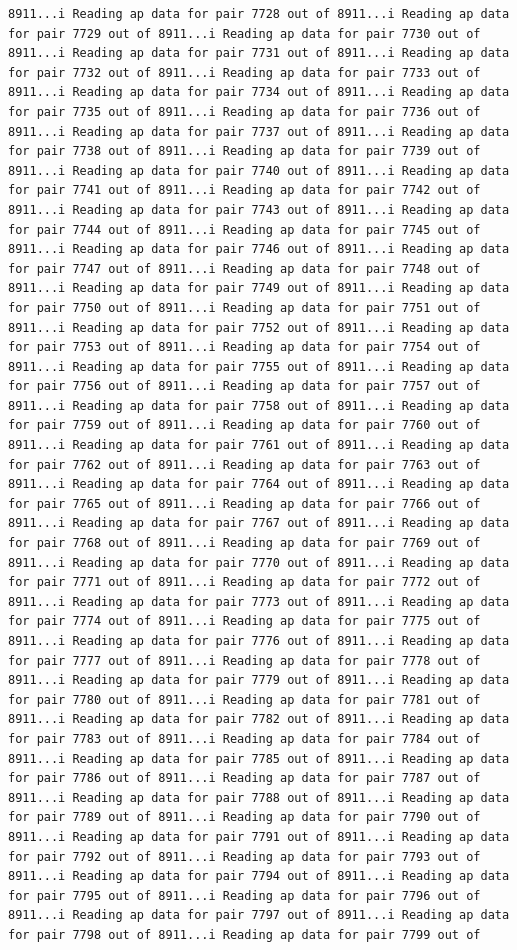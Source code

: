 \documentclass[
]{article}
\begin{document}
\begin{verbatim}
8911...i Reading ap data for pair 7728 out of 8911...i Reading ap data for pair 7729 out of 8911...i Reading ap data for pair 7730 out of 8911...i Reading ap data for pair 7731 out of 8911...i Reading ap data for pair 7732 out of 8911...i Reading ap data for pair 7733 out of 8911...i Reading ap data for pair 7734 out of 8911...i Reading ap data for pair 7735 out of 8911...i Reading ap data for pair 7736 out of 8911...i Reading ap data for pair 7737 out of 8911...i Reading ap data for pair 7738 out of 8911...i Reading ap data for pair 7739 out of 8911...i Reading ap data for pair 7740 out of 8911...i Reading ap data for pair 7741 out of 8911...i Reading ap data for pair 7742 out of 8911...i Reading ap data for pair 7743 out of 8911...i Reading ap data for pair 7744 out of 8911...i Reading ap data for pair 7745 out of 8911...i Reading ap data for pair 7746 out of 8911...i Reading ap data for pair 7747 out of 8911...i Reading ap data for pair 7748 out of 8911...i Reading ap data for pair 7749 out of 8911...i Reading ap data for pair 7750 out of 8911...i Reading ap data for pair 7751 out of 8911...i Reading ap data for pair 7752 out of 8911...i Reading ap data for pair 7753 out of 8911...i Reading ap data for pair 7754 out of 8911...i Reading ap data for pair 7755 out of 8911...i Reading ap data for pair 7756 out of 8911...i Reading ap data for pair 7757 out of 8911...i Reading ap data for pair 7758 out of 8911...i Reading ap data for pair 7759 out of 8911...i Reading ap data for pair 7760 out of 8911...i Reading ap data for pair 7761 out of 8911...i Reading ap data for pair 7762 out of 8911...i Reading ap data for pair 7763 out of 8911...i Reading ap data for pair 7764 out of 8911...i Reading ap data for pair 7765 out of 8911...i Reading ap data for pair 7766 out of 8911...i Reading ap data for pair 7767 out of 8911...i Reading ap data for pair 7768 out of 8911...i Reading ap data for pair 7769 out of 8911...i Reading ap data for pair 7770 out of 8911...i Reading ap data for pair 7771 out of 8911...i Reading ap data for pair 7772 out of 8911...i Reading ap data for pair 7773 out of 8911...i Reading ap data for pair 7774 out of 8911...i Reading ap data for pair 7775 out of 8911...i Reading ap data for pair 7776 out of 8911...i Reading ap data for pair 7777 out of 8911...i Reading ap data for pair 7778 out of 8911...i Reading ap data for pair 7779 out of 8911...i Reading ap data for pair 7780 out of 8911...i Reading ap data for pair 7781 out of 8911...i Reading ap data for pair 7782 out of 8911...i Reading ap data for pair 7783 out of 8911...i Reading ap data for pair 7784 out of 8911...i Reading ap data for pair 7785 out of 8911...i Reading ap data for pair 7786 out of 8911...i Reading ap data for pair 7787 out of 8911...i Reading ap data for pair 7788 out of 8911...i Reading ap data for pair 7789 out of 8911...i Reading ap data for pair 7790 out of 8911...i Reading ap data for pair 7791 out of 8911...i Reading ap data for pair 7792 out of 8911...i Reading ap data for pair 7793 out of 8911...i Reading ap data for pair 7794 out of 8911...i Reading ap data for pair 7795 out of 8911...i Reading ap data for pair 7796 out of 8911...i Reading ap data for pair 7797 out of 8911...i Reading ap data for pair 7798 out of 8911...i Reading ap data for pair 7799 out of 
\end{verbatim}
\end{document}
